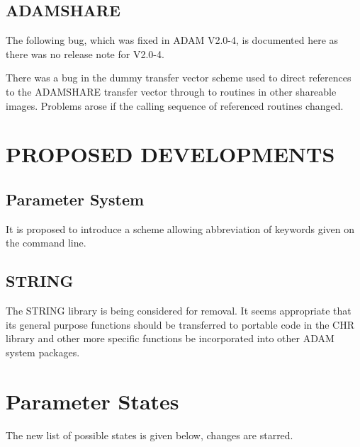 \subsection{ADAMSHARE}
The following bug, which was fixed in ADAM V2.0-4, is documented here as
there was no release note for V2.0-4.

There was a bug in the dummy transfer vector scheme used to direct
references to the ADAM\-SHARE transfer vector through to routines in other
shareable images. Problems arose if the calling sequence of referenced routines
changed.

\section{PROPOSED DEVELOPMENTS}
\subsection{Parameter System}
It is proposed to introduce a scheme allowing abbreviation of keywords given
on the command line.
\subsection{STRING}
The STRING library is being considered for removal. It seems appropriate that
its general purpose functions should be transferred to portable code in the
CHR library and other more specific functions be incorporated into other
ADAM system packages.

\newpage
\appendix
\section{Parameter States}
\label{states}
The new list of possible states is given below, changes are starred.


